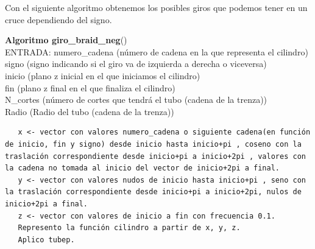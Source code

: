 \bigskip
Con el siguiente algoritmo obtenemos los posibles giros que podemos tener en un cruce dependiendo del signo. 
\begin{alg}
    	\textbf{Algoritmo giro\_braid\_neg}()\\
    	ENTRADA: numero\_cadena (número de cadena en la que representa el cilindro)\\
    	\hspace*{2.2cm} signo (signo indicando si el giro va de izquierda a derecha o viceversa)\\
    	\hspace*{2.2cm} inicio (plano z inicial en el que iniciamos el cilindro)\\
    	\hspace*{2.2cm} fin (plano z final en el que finaliza el cilindro)\\
    	\hspace*{2.2cm} N\_cortes (número de cortes que tendrá el tubo (cadena de la trenza))\\
    	\hspace*{2.2cm} Radio (Radio del tubo (cadena de la trenza))
    	
\begin{lstlisting}
   x <- vector con valores numero_cadena o siguiente cadena(en función de inicio, fin y signo) desde inicio hasta inicio+pi , coseno con la traslación correspondiente desde inicio+pi a inicio+2pi , valores con la cadena no tomada al inicio del vector de inicio+2pi a final.
   y <- vector con valores nudos de inicio hasta inicio+pi , seno con la traslación correspondiente desde inicio+pi a inicio+2pi, nulos de inicio+2pi a final.
   z <- vector con valores de inicio a fin con frecuencia 0.1.   
   Represento la función cilindro a partir de x, y, z. 
   Aplico tubep. 
\end{lstlisting}
\end{alg}

